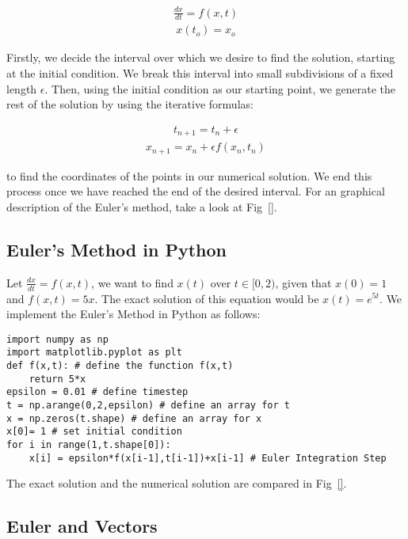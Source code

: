 \documentclass[10pt,letterpaper]{article}
\begin{document}
\begin{eqnarray}\frac{dx}{dt} = f(x, t)\end{eqnarray}
\begin{eqnarray}x(t_o) = x_o\end{eqnarray}

Firstly, we decide the interval over which we desire to find the solution, starting at the initial condition. We break this interval into small subdivisions of a fixed length $\epsilon$. Then, using the initial condition as our starting point, we generate the rest of the solution by using the iterative formulas:

\begin{eqnarray} t_{n+1} = t_n + \epsilon \end{eqnarray}
\begin{eqnarray} x_{n+1} = x_n + \epsilon f(x_n, t_n) \end{eqnarray}

to find the coordinates of the points in our numerical solution. We end this process once we have reached the end of the desired interval. For an graphical description of the Euler's method, take a look at Fig~\ref{}.

\subsection*{Euler's Method in Python}

Let $\frac{dx}{dt}=f(x,t)$, we want to find $x(t)$ over $t\in[0,2)$, given that $x(0)=1$ and $f(x,t) = 5x$. The exact solution of this equation would be $x(t) = e^{5t}$. We implement the Euler's Method in Python as follows:

\begin{verbatim}
import numpy as np
import matplotlib.pyplot as plt
def f(x,t): # define the function f(x,t)
    return 5*x
epsilon = 0.01 # define timestep
t = np.arange(0,2,epsilon) # define an array for t
x = np.zeros(t.shape) # define an array for x
x[0]= 1 # set initial condition
for i in range(1,t.shape[0]):
    x[i] = epsilon*f(x[i-1],t[i-1])+x[i-1] # Euler Integration Step
\end{verbatim}

The exact solution and the numerical solution are compared in Fig~\ref{}.

\subsection*{Euler and Vectors}
\end{document}
